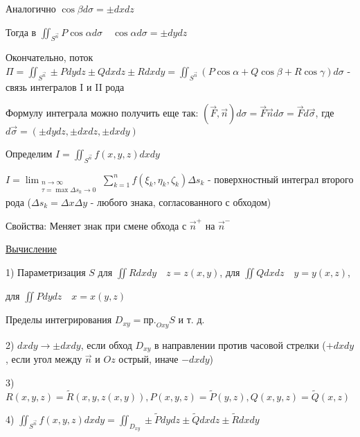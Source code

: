 \documentclass[12pt]{article}
\begin{document}
\begin{enumerate}[label*=\textbf{\arabic** }]
    Аналогично $\cos\beta d\sigma = \pm dxdz$

    Тогда в $\iint_{S^{\overrightarrow{n}}} P\cos\alpha d\sigma \quad \cos\alpha d\sigma = \pm dydz$

    \hypertarget{connectionbetweensurfaceintegral}{}

    Окончательно, поток $\Pi = \iint_{S^{\overrightarrow{n}}} \pm Pdydz \pm Qdxdz \pm Rdxdy = \iint_{S^{\overrightarrow{n}}} (P\cos\alpha + Q\cos\beta + R\cos\gamma) d\sigma$ - связь интегралов I и II рода

    \Nota Формулу интеграла можно получить еще так: $(\overrightarrow{F}, \overrightarrow{n})d\sigma = \overrightarrow{F}\overrightarrow{n}d\sigma = \overrightarrow{F}d\overrightarrow{\sigma}$, где $d\overrightarrow{\sigma} = (\pm dydz, \pm dxdz, \pm dxdy)$

    \hypertarget{surfaceintegralofsecondkindmath}{}


    Определим $I = \iint_{S^{\overrightarrow{n}}} f(x, y, z) dxdy$

    $I = \lim_{\substack{n \to \infty \\ \tau = \max \Delta s_k \to 0}} \sum_{k=1}^n f(\xi_k, \eta_k, \zeta_k) \Delta s_k$ - поверхностный интеграл второго рода
    ($\Delta s_k = \Delta x\Delta y$ - любого знака, согласованного с обходом)

    \hypertarget{surfaceintegralofsecondkindproperties}{}

    Свойства: Меняет знак при смене обхода с $\overrightarrow{n}^+$ на $\overrightarrow{n}^-$

    \hypertarget{surfaceintegralofsecondkindcalculation}{}

    \underline{Вычисление}

    1) Параметризация $S$ \quad для $\iint Rdxdy \quad z = z(x, y)$, для $\iint Qdxdz \quad y = y(x, z)$,

    для $\iint Pdydz \quad x = x(y, z)$

    Пределы интегрирования $D_{xy} = \text{пр.}_{Oxy} S$ и т. д.

    2) $dxdy \to \pm dxdy$, если обход $D_{xy}$ в направлении против часовой стрелки ($+dxdy$, если угол между $\overrightarrow{n}$ и $Oz$ острый, иначе $-dxdy$)

    3) $R(x, y, z) = \tilde{R}(x, y, z(x, y)), P(x, y, z) = \tilde{P}(y, z), Q(x, y, z) = \tilde{Q}(x, z)$

    4) $\iint_{S^{\overrightarrow{n}}} f(x, y, z) dxdy = \iint_{D_{xy}} \pm \tilde{P}dydz \pm \tilde{Q}dxdz \pm \tilde{R}dxdy$
    \end{enumerate}
\end{document}

